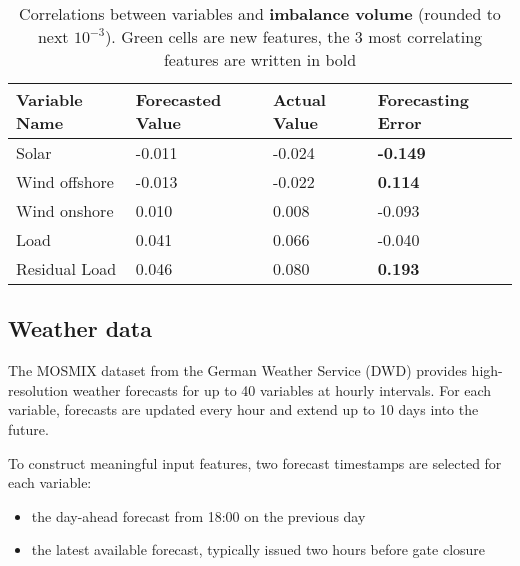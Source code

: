 \documentclass[class=scrbook, crop=false]{standalone}
\begin{document}



    \begin{table}
    \centering
    \begin{tabular}{l|l|l|l}
    Variable Name	&Forecasted Value& Actual Value	& Forecasting Error \\\hline
    Solar 		&  -0.011		& -0.024		& \cellcolor{green} \textbf{-0.149} \\
    Wind offshore 	& -0.013		&  -0.022		& \cellcolor{green}\textbf{0.114}\\
    Wind onshore 	& 0.010		& 0.008		& \cellcolor{green} -0.093\\
    Load 		& 0.041		& 0.066		& \cellcolor{green}  -0.040 \\
    Residual Load 	& \cellcolor{green} 0.046& \cellcolor{green} 0.080& \cellcolor{green} \textbf{0.193}\\
    \end{tabular}

    
    \caption{Correlations between variables and \textbf{imbalance volume} (rounded to next $10^{-3}$). Green cells are new features, the 3 most correlating features are written in bold}
    \label{Table::Imbalance_volume_Correlations_ENTSOE}
    \end{table}
    
    
    \subsection{Weather data}
    \label{Section::Weather_data}

The MOSMIX dataset from the German Weather Service (DWD) provides high-resolution weather forecasts for up to 40 variables at hourly intervals. For each variable, forecasts are updated every hour and extend up to 10 days into the future.

To construct meaningful input features, two forecast timestamps are selected for each variable:
\begin{itemize}
\item the day-ahead forecast from 18:00 on the previous day 
\item the latest available forecast, typically issued two hours before gate closure
\end{itemize}
\end{document}
